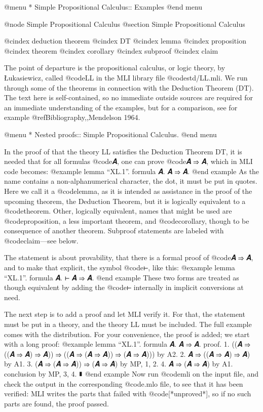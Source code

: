 @menu
* Simple Propositional Calculus:: Examples
@end menu


@node Simple Propositional Calculus
@section Simple Propositional Calculus

@cindex deduction theorem
@cindex DT
@cindex lemma
@cindex proposition
@cindex theorem
@cindex corollary
@cindex subproof
@cindex claim

The point of departure is the propositional calculus, or logic theory, by Łukasiewicz, called @code{LL} in the MLI library file @code{std/LL.mli}. We run through some of the theorems in connection with the Deduction Theorem (DT). The text here is self-contained, so no immediate outside sources are required for an immediate understanding of the examples, but for a comparison, see for example @ref{Bibliography,,Mendelson 1964}.

@menu
* Nested proofs::   Simple Propositional Calculus.
@end menu


In the proof of that the theory LL satisfies the Deduction Theorem DT, it is needed that for all formulas @code{𝑨}, one can prove @code{𝑨 ⇒ 𝑨}, which in MLI code becomes:
@example
lemma “XL.1”. formula 𝑨. 𝑨 ⇒ 𝑨.
@end example
As the name contains a non-alphanumerical character, the dot, it must be put in quotes. Here we call it a @code{lemma}, as it is intended as assistance in the proof of the upcoming theorem, the Deduction Theorem, but it is logically equivalent to a @code{theorem}. Other, logically equivalent, names that might be used are @code{proposition}, a less important theorem, and @code{corollary}, though to be consequence of another theorem. Subproof statements are labeled with @code{claim}—see below.

The statement is about provability, that there is a formal proof of @code{𝑨 ⇒ 𝑨}, and to make that explicit, the symbol @code{⊢}, like this:
@example
lemma “XL.1”. formula 𝑨. ⊢ 𝑨 ⇒ 𝑨.
@end example
These two forms are treated as though equivalent by adding the @code{⊢} internally in implicit conversions at need.

The next step is to add a proof and let MLI verify it. For that, the statement must be put in a theory, and the theory LL must be included. The full example comes with the distribution. For your convenience, the proof is added; we start with a long proof:
@example
lemma “XL.1”. formula 𝑨. 𝑨 ⇒ 𝑨.
proof.
  1. ((𝑨 ⇒ ((𝑨 ⇒ 𝑨) ⇒ 𝑨)) ⇒ ((𝑨 ⇒ (𝑨 ⇒ 𝑨)) ⇒ (𝑨 ⇒ 𝑨))) by A2.
  2. 𝑨 ⇒ ((𝑨 ⇒ 𝑨) ⇒ 𝑨) by A1.
  3. (𝑨 ⇒ (𝑨 ⇒ 𝑨)) ⇒ (𝑨 ⇒ 𝑨) by MP, 1, 2.
  4. 𝑨 ⇒ (𝑨 ⇒ 𝑨) by A1.
  conclusion by MP, 3, 4.
∎
@end example
Now run @code{mli} on the input file, and check the output in the corresponding @code{.mlo} file, to see that it has been verified: MLI writes the parts that failed with @code{[*unproved*]}, so if no such parts are found, the proof passed.


